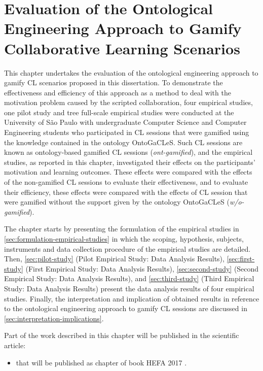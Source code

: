 \chapter[Evaluation of the Ontological Engineering Approach to Gamify CL Scenarios]{Evaluation of the Ontological Engineering Approach to Gamify Collaborative Learning Scenarios}
\label{chapter:evaluation}

This chapter undertakes the evaluation of the ontological engineering approach to gamify CL scenarios proposed in this dissertation. To demonstrate the effectiveness and efficiency of this approach as a method to deal with the motivation problem caused by the scripted collaboration, four empirical studies, one pilot study and tree full-scale empirical studies were conducted at the University of São Paulo with undergraduate Computer Science and Computer Engineering students who participated in CL sessions that were gamified using the knowledge contained in the ontology OntoGaCLeS. Such CL sessions are known as ontology-based gamified CL sessions (\emph{ont-gamified}), and the empirical studies, as reported in this chapter, investigated their effects on the participants' motivation and learning outcomes. These effects were compared with the effects of the non-gamified CL sessions to evaluate their effectiveness, and to evaluate their efficiency, these effects were compared with the effects of CL session that were gamified without the support given by the ontology OntoGaCLeS (\emph{w/o-gamified}).

The chapter starts by presenting the formulation of the empirical studies in \autoref{sec:formulation-empirical-studies} in which the scoping, hypothesis, subjects, instruments and data collection procedure of the empirical studies are detailed. Then, \autoref{sec:pilot-study} (Pilot Empirical Study: Data Analysis Results), \autoref{sec:first-study} (First Empirical Study: Data Analysis Results), \autoref{sec:second-study} (Second Empirical Study: Data Analysis Results), and \autoref{sec:third-study} (Third Empirical Study: Data Analysis Results) present the data analysis results of four empirical studies. Finally, the interpretation and implication of obtained results in reference to the ontological engineering approach to gamify CL sessions are discussed in \autoref{sec:interpretation-implications}.

Part of the work described in this chapter will be published in the scientific article:

\begin{itemize}
\item
{} that will be published as chapter of book  HEFA 2017 \cite{ChallcoMizoguchiIsotani2017}.
\end{itemize}

